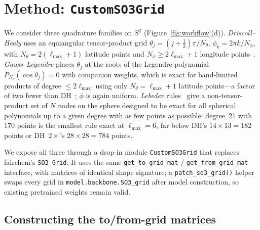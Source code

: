 \documentclass{article}
\begin{document}
\section{Method: \texttt{CustomSO3Grid}}
\label{sec:method}

We consider three quadrature families on $S^2$ (Figure~\ref{fig:workflow}(d)).
\emph{Driscoll--Healy} uses an equiangular tensor-product grid
$\theta_j = (j+\tfrac{1}{2})\pi/N_\theta$, $\phi_k = 2\pi k/N_\phi$,
with $N_\theta = 2(\ell_{\max}+1)$ latitude points and
$N_\phi \geq 2\ell_{\max}+1$ longitude points~\cite{driscoll_healy}.
\emph{Gauss--Legendre} places $\theta_j$ at the roots of the Legendre
polynomial $P_{N_\theta}(\cos\theta_j) = 0$ with companion weights,
which is exact for band-limited products of degree $\leq 2\ell_{\max}$
using only $N_\theta = \ell_{\max}+1$ latitude points---a factor of
two fewer than DH~\cite{shtools}; $\phi$ is again uniform.
\emph{Lebedev} rules~\cite{lebedev_quadrature} give a non-tensor-product
set of $N$ nodes on the sphere designed to be exact for all spherical
polynomials up to a given degree with as few points as possible:
degree~21 with 170 points is the smallest rule exact at
$\ell_{\max}{=}6$, far below DH's $14 \times 13 = 182$ points or
DH~$2\times$'s $28 \times 28 = 784$ points.

We expose all three through a drop-in module \texttt{CustomSO3Grid}
that replaces fairchem's \texttt{SO3\_Grid}. It uses the same
\texttt{get\_to\_grid\_mat} / \texttt{get\_from\_grid\_mat}
interface, with matrices of identical shape signature; a
\texttt{patch\_so3\_grid()} helper swaps every grid in
\texttt{model.backbone.SO3\_grid} after model construction, so
existing pretrained weights remain valid.

\subsection{Constructing the to/from-grid matrices}
\end{document}
